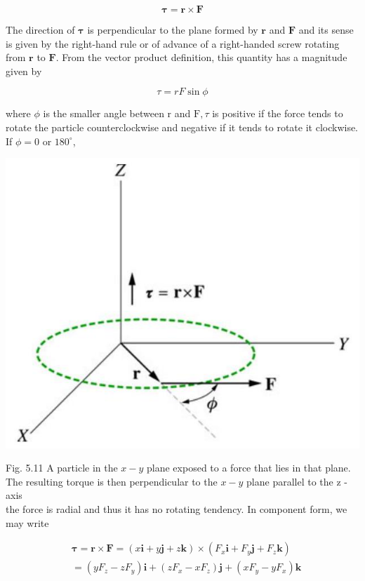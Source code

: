 \documentclass[10pt]{article}
\begin{document}
$$
\boldsymbol{\tau}=\mathbf{r} \times \mathbf{F}
$$

The direction of $\boldsymbol{\tau}$ is perpendicular to the plane formed by $\mathbf{r}$ and $\mathbf{F}$ and its sense is given by the right-hand rule or of advance of a right-handed screw rotating from $\mathbf{r}$ to $\mathbf{F}$. From the vector product definition, this quantity has a magnitude given by

$$
\tau=r F \sin \phi
$$

where $\phi$ is the smaller angle between r and $\mathrm{F}, \tau$ is positive if the force tends to rotate the particle counterclockwise and negative if it tends to rotate it clockwise. If $\phi=0$ or $180^{\circ}$,

\begin{center}
\includegraphics[max width=\textwidth]{2024_09_13_db1f357d2aad0a03eb2eg-090}
\end{center}

Fig. 5.11 A particle in the $x-y$ plane exposed to a force that lies in that plane. The resulting torque is then perpendicular to the $x-y$ plane parallel to the z -axis\\
the force is radial and thus it has no rotating tendency. In component form, we may write

$$
\begin{aligned}
& \boldsymbol{\tau}=\mathbf{r} \times \mathbf{F}=(x \mathbf{i}+y \mathbf{j}+z \mathbf{k}) \times\left(F_{x} \mathbf{i}+F_{y} \mathbf{j}+F_{z} \mathbf{k}\right) \\
& =\left(y F_{z}-z F_{y}\right) \mathbf{i}+\left(z F_{x}-x F_{z}\right) \mathbf{j}+\left(x F_{y}-y F_{x}\right) \mathbf{k}
\end{aligned}
$$
\end{document}
